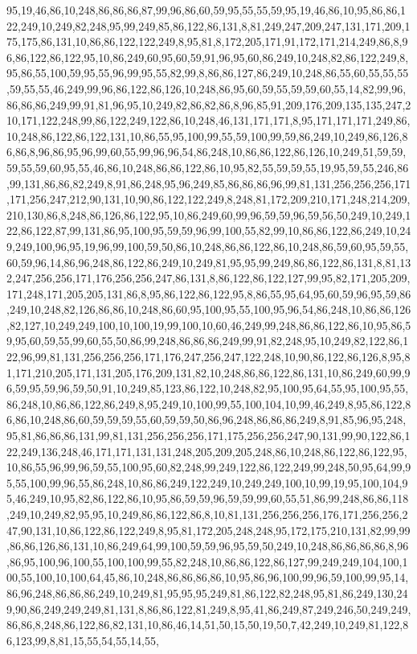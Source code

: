 95,19,46,86,10,248,86,86,86,87,99,96,86,60,59,95,55,55,59,95,19,46,86,10,95,86,86,122,249,10,249,82,248,95,99,249,85,86,122,86,131,8,81,249,247,209,247,131,171,209,175,175,86,131,10,86,86,122,122,249,8,95,81,8,172,205,171,91,172,171,214,249,86,8,96,86,122,86,122,95,10,86,249,60,95,60,59,91,96,95,60,86,249,10,248,82,86,122,249,8,95,86,55,100,59,95,55,96,99,95,55,82,99,8,86,86,127,86,249,10,248,86,55,60,55,55,55,59,55,55,46,249,99,96,86,122,86,126,10,248,86,95,60,59,55,59,59,60,55,14,82,99,96,86,86,86,249,99,91,81,96,95,10,249,82,86,82,86,8,96,85,91,209,176,209,135,135,247,210,171,122,248,99,86,122,249,122,86,10,248,46,131,171,171,8,95,171,171,171,249,86,10,248,86,122,86,122,131,10,86,55,95,100,99,55,59,100,99,59,86,249,10,249,86,126,86,86,8,96,86,95,96,99,60,55,99,96,96,54,86,248,10,86,86,122,86,126,10,249,51,59,59,59,55,59,60,95,55,46,86,10,248,86,86,122,86,10,95,82,55,59,59,55,19,95,59,55,246,86,99,131,86,86,82,249,8,91,86,248,95,96,249,85,86,86,86,96,99,81,131,256,256,256,171,171,256,247,212,90,131,10,90,86,122,122,249,8,248,81,172,209,210,171,248,214,209,210,130,86,8,248,86,126,86,122,95,10,86,249,60,99,96,59,59,96,59,56,50,249,10,249,122,86,122,87,99,131,86,95,100,95,59,59,96,99,100,55,82,99,10,86,86,122,86,249,10,249,249,100,96,95,19,96,99,100,59,50,86,10,248,86,86,122,86,10,248,86,59,60,95,59,55,60,59,96,14,86,96,248,86,122,86,249,10,249,81,95,95,99,249,86,86,122,86,131,8,81,132,247,256,256,171,176,256,256,247,86,131,8,86,122,86,122,127,99,95,82,171,205,209,171,248,171,205,205,131,86,8,95,86,122,86,122,95,8,86,55,95,64,95,60,59,96,95,59,86,249,10,248,82,126,86,86,10,248,86,60,95,100,95,55,100,95,96,54,86,248,10,86,86,126,82,127,10,249,249,100,10,100,19,99,100,10,60,46,249,99,248,86,86,122,86,10,95,86,59,95,60,59,55,99,60,55,50,86,99,248,86,86,86,249,99,91,82,248,95,10,249,82,122,86,122,96,99,81,131,256,256,256,171,176,247,256,247,122,248,10,90,86,122,86,126,8,95,81,171,210,205,171,131,205,176,209,131,82,10,248,86,86,122,86,131,10,86,249,60,99,96,59,95,59,96,59,50,91,10,249,85,123,86,122,10,248,82,95,100,95,64,55,95,100,95,55,86,248,10,86,86,122,86,249,8,95,249,10,100,99,55,100,104,10,99,46,249,8,95,86,122,86,86,10,248,86,60,59,59,59,55,60,59,59,50,86,96,248,86,86,86,249,8,91,85,96,95,248,95,81,86,86,86,131,99,81,131,256,256,256,171,175,256,256,247,90,131,99,90,122,86,122,249,136,248,46,171,171,131,131,248,205,209,205,248,86,10,248,86,122,86,122,95,10,86,55,96,99,96,59,55,100,95,60,82,248,99,249,122,86,122,249,99,248,50,95,64,99,95,55,100,99,96,55,86,248,10,86,86,249,122,249,10,249,249,100,10,99,19,95,100,104,95,46,249,10,95,82,86,122,86,10,95,86,59,59,96,59,59,99,60,55,51,86,99,248,86,86,118,249,10,249,82,95,95,10,249,86,86,122,86,8,10,81,131,256,256,256,176,171,256,256,247,90,131,10,86,122,86,122,249,8,95,81,172,205,248,248,95,172,175,210,131,82,99,99,86,86,126,86,131,10,86,249,64,99,100,59,59,96,95,59,50,249,10,248,86,86,86,86,8,96,86,95,100,96,100,55,100,100,99,55,82,248,10,86,86,122,86,127,99,249,249,104,100,100,55,100,10,100,64,45,86,10,248,86,86,86,86,10,95,86,96,100,99,96,59,100,99,95,14,86,96,248,86,86,86,249,10,249,81,95,95,95,249,81,86,122,82,248,95,81,86,249,130,249,90,86,249,249,249,81,131,8,86,86,122,81,249,8,95,41,86,249,87,249,246,50,249,249,86,86,8,248,86,122,86,82,131,10,86,46,14,51,50,15,50,19,50,7,42,249,10,249,81,122,86,123,99,8,81,15,55,54,55,14,55,